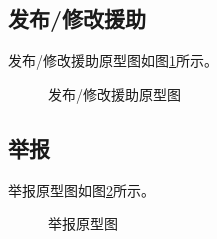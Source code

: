 \subsection{发布/修改援助}
发布/修改援助原型图如图\ref{fig:edit}所示。
\begin{figure}[htbp]
    \centering
    \caption{发布/修改援助原型图}\label{fig:edit}
    \vspace{\baselineskip} %
\end{figure}

\subsection{举报}
举报原型图如图\ref{fig:jubao}所示。
\begin{figure}[htbp]
    \centering
    \caption{举报原型图}\label{fig:jubao}
    \vspace{\baselineskip} %
\end{figure}